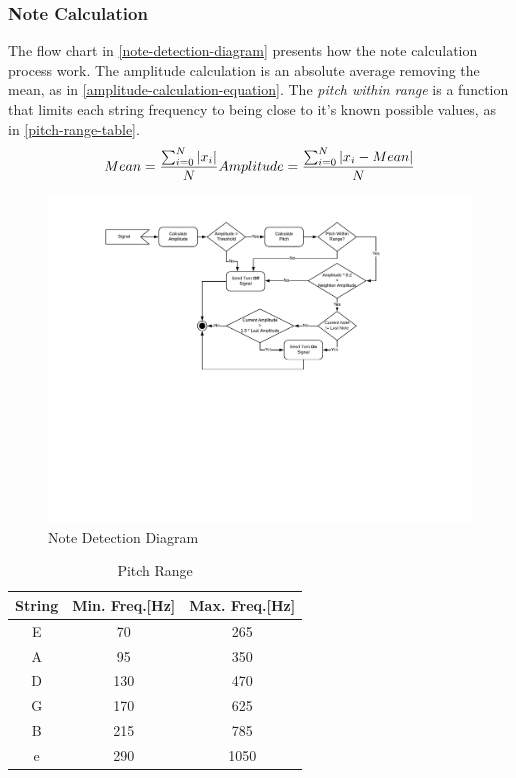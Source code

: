 \subsubsection{Note Calculation}
The flow chart in \autoref{note-detection-diagram} presents how the note calculation
process work. The amplitude calculation is an absolute average removing the mean, as in
\autoref{amplitude-calculation-equation}. The \textit{pitch within range} is a function that limits
each string frequency to being close to it's known possible values, as in \autoref{pitch-range-table}.
\begin{equation}
  \label{amplitude-calculation-equation}
  Mean = \frac{\sum_{i=0}^{N}{\left | x_{i} \right |}}{N}\\
	Amplitude = \frac{\sum_{i=0}^{N}{\left | x_{i} - Mean \right |}}{N}\end{equation}
\begin{figure}[htb]
	\caption{Note Detection Diagram}
	\label{note-detection-diagram}
	\begin{center}
		\includegraphics[width=0.7\paperwidth]{images/note-detection-flow-diagram}
	\end{center}
\end{figure}

\begin{table}[htb]
  \ABNTEXreducedfont
  \caption[Pitch Range]{Pitch Range}
  \label{pitch-range-table}
  \centering
  \begin{tabular}{c|c|c}
    \textbf{String} & \textbf{Min. Freq.[Hz]} & \textbf{Max. Freq.[Hz]} \\
		\hline \hline
		E & 70 & 265 \\
		\hline
		A & 95 & 350 \\
		\hline
		D & 130 & 470 \\
		\hline
		G & 170 & 625 \\
		\hline
		B & 215 & 785 \\
		\hline
		e & 290 & 1050 \\
  \end{tabular}
\end{table}

